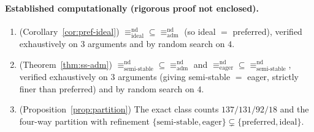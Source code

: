 \documentclass{amsart}
\theoremstyle{remark}
\begin{document}
\paragraph{Established computationally (rigorous proof not enclosed).}
\begin{enumerate}
\item[(7)] (Corollary~\ref{cor:pref-ideal}) $\equiv^{\mathrm{nd}}_{\mathrm{ideal}}
\subseteq\equiv^{\mathrm{nd}}_{\mathrm{adm}}$ (so ideal $=$ preferred), verified
exhaustively on $3$ arguments and by random search on $4$.
\item[(8)] (Theorem~\ref{thm:ss-adm}) $\equiv^{\mathrm{nd}}_{\mathrm{semi\text{-}
stable}}\subseteq\equiv^{\mathrm{nd}}_{\mathrm{adm}}$ and
$\equiv^{\mathrm{nd}}_{\mathrm{eager}}\subseteq
\equiv^{\mathrm{nd}}_{\mathrm{semi\text{-}stable}}$, verified exhaustively on $3$
arguments (giving semi-stable $=$ eager, strictly finer than preferred) and by
random search on $4$.
\item[(9)] (Proposition~\ref{prop:partition}) The exact class counts
$137/131/92/18$ and the four-way partition with refinement
$\{\mathrm{semi\text{-}stable},\mathrm{eager}\}\subsetneq
\{\mathrm{preferred},\mathrm{ideal}\}$.
\end{enumerate}
\end{document}
